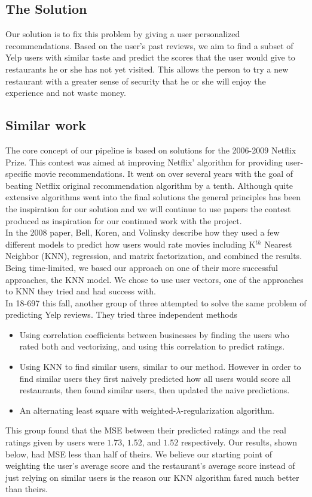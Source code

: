 \documentclass[10pt,twocolumn,letterpaper]{article}
\begin{document}
\subsection{The Solution}
Our solution is to fix this problem by giving a user personalized recommendations. Based on the user's past reviews, we aim to find a subset of Yelp users with similar taste and predict the scores that the user would give to restaurants he or she has not yet visited. This allows the person to try a new restaurant with a greater sense of security that he or she will enjoy the experience and not waste money.
\subsection{Similar work}
The core concept of our pipeline is based on solutions for the 2006-2009 Netflix Prize. This contest was aimed at improving Netflix' algorithm for providing user-specific movie recommendations. It went on over several years with the goal of beating Netflix original recommendation algorithm by a tenth. Although quite extensive algorithms went into the final solutions the general principles has been the inspiration for our solution and we will continue to use papers the contest produced as inspiration for our continued work with the project\cite{KorBell}\cite{BellKor}.\\
\indent In the 2008 paper, Bell, Koren, and Volinsky describe how they used a few different models to predict how users would rate movies including K$^{th}$ Nearest Neighbor (KNN), regression, and matrix factorization, and combined the results. Being time-limited, we based our approach on one of their more successful approaches, the KNN model. We chose to use user vectors, one of the approaches to KNN they tried and had success with.\\
\indent In 18-697 this fall, another group of three attempted to solve the same problem of predicting Yelp reviews. They tried three independent methods\cite{ClassPresentation}
\begin{itemize}
\item Using correlation coefficients between businesses by finding the users who rated both and vectorizing, and using this correlation to predict ratings.
\item Using KNN to find similar users, similar to our method. However in order to find similar users they first naively predicted how all users would score all restaurants, then found similar users, then updated the naive predictions.
\item An alternating least square with weighted-$\lambda$-regularization algorithm.
\end{itemize}
This group found that the MSE between their predicted ratings and the real ratings given by users were $1.73$, $1.52$, and $1.52$ respectively. Our results, shown below, had MSE less than half of theirs. We believe our starting point of weighting the user's average score and the restaurant's average score instead of just relying on similar users is the reason our KNN algorithm fared much better than theirs.
\end{document}
